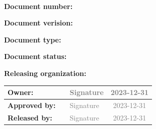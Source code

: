 \vspace{3cm}

\begin{center}
  \begin{tcolorbox}[colframe=andesbrown, colback=andesgray, width=\textwidth]
    \

    \begin{center}
      {\bf \Large \bigskip \textcolor{andesbrown} \ESOdoctitle{} }
    \end{center}

    \bigskip

    \bigskip

    {\bf Document number:} \ESOdocnumber{}

    \medskip

    {\bf Document verision:} \ESOdocversion{}

    \smallskip

    {\bf Document type:} \ESOdoctype{}

    \smallskip

    {\bf Document status:} \ESOdocstatus{}

    \smallskip

    {\bf Releasing organization:} \ESOdocorganization{}

    \bigskip

  \end{tcolorbox}
\end{center}

\vfill

\begin{center}
  \begin{tabularx}{\textwidth}{|l|X|l|c|}
    \hline
    {\bf \small Owner:}       &  \ESOowner{}             & \textcolor{gray}{Signature} & \textcolor{gray}{2023-12-31} \\[0.8cm] \hline
    {\bf \small Approved by:} &  \ESOapprovedby{}        & \textcolor{gray}{Signature} & \textcolor{gray}{2023-12-31} \\[0.8cm] \hline
    {\bf \small Released by:} &  \ESOreleasedby{}        & \textcolor{gray}{Signature} & \textcolor{gray}{2023-12-31} \\[0.8cm] \hline
    \end{tabularx}
\end{center}


\restoregeometry

\newpage
\tableofcontents \thispagestyle{fancy}


